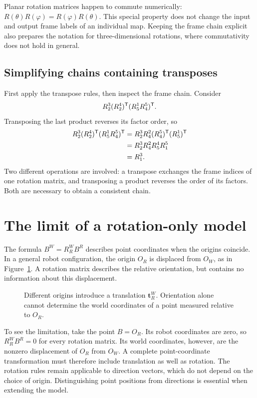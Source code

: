 Planar rotation matrices happen to commute numerically:
$R(\theta)R(\varphi)=R(\varphi)R(\theta)$. This special property does not
change the input and output frame labels of an individual map. Keeping the
frame chain explicit also prepares the notation for three-dimensional
rotations, where commutativity does not hold in general.

\subsection{Simplifying chains containing transposes}
First apply the transpose rules, then inspect the frame chain. Consider
\[
 R_2^3 (R_2^4)^{\mathsf T} (R_5^1 R_4^5)^{\mathsf T}.
\]
Transposing the last product reverses its factor order, so
\begin{align*}
 R_2^3 (R_2^4)^{\mathsf T} (R_5^1 R_4^5)^{\mathsf T}
 &=R_2^3 R_4^2 (R_4^5)^{\mathsf T} (R_5^1)^{\mathsf T}\\
 &=R_2^3 R_4^2 R_5^4 R_1^5\\
 &=R_1^3.
\end{align*}
Two different operations are involved: a transpose exchanges the frame indices
of one rotation matrix, and transposing a product reverses the order of its
factors. Both are necessary to obtain a consistent chain.

\section{The limit of a rotation-only model}
The formula $B^W=R_R^W B^R$ describes point coordinates when the origins
coincide. In a general robot configuration, the origin $O_R$ is displaced from
$O_W$, as in Figure~\ref{fig:l02-translation}. A rotation matrix describes the
relative orientation, but contains no information about this displacement.

\begin{figure}[htbp]
\centering
\caption{Different origins introduce a translation $\boldsymbol{t}_R^W$.
Orientation alone cannot determine the world coordinates of a point measured
relative to $O_R$.}
\label{fig:l02-translation}
\end{figure}

To see the limitation, take the point $B=O_R$. Its robot coordinates are zero,
so $R_R^W B^R=0$ for every rotation matrix. Its world coordinates, however,
are the nonzero displacement of $O_R$ from $O_W$. A complete point-coordinate
transformation must therefore include translation as well as rotation.
The rotation rules remain applicable to direction vectors, which do not depend
on the choice of origin. Distinguishing point positions from directions is
essential when extending the model.

